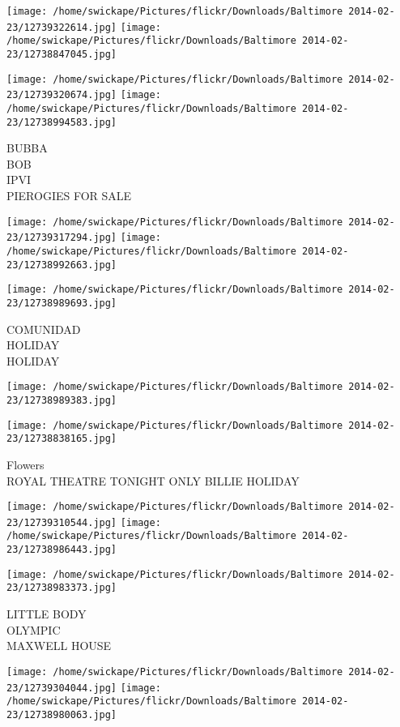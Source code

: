 \documentclass[10pt,letterpaper]{article}
\begin{document}
\texttt{[image: /home/swickape/Pictures/flickr/Downloads/Baltimore 2014-02-23/12739322614.jpg]}
\texttt{[image: /home/swickape/Pictures/flickr/Downloads/Baltimore 2014-02-23/12738847045.jpg]}

\texttt{[image: /home/swickape/Pictures/flickr/Downloads/Baltimore 2014-02-23/12739320674.jpg]}
\texttt{[image: /home/swickape/Pictures/flickr/Downloads/Baltimore 2014-02-23/12738994583.jpg]}

BUBBA\\
BOB\\
IPVI\\
PIEROGIES FOR SALE
\pagebreak

\texttt{[image: /home/swickape/Pictures/flickr/Downloads/Baltimore 2014-02-23/12739317294.jpg]}
\texttt{[image: /home/swickape/Pictures/flickr/Downloads/Baltimore 2014-02-23/12738992663.jpg]}

\texttt{[image: /home/swickape/Pictures/flickr/Downloads/Baltimore 2014-02-23/12738989693.jpg]}

COMUNIDAD\\
HOLIDAY\\
HOLIDAY
\pagebreak

\texttt{[image: /home/swickape/Pictures/flickr/Downloads/Baltimore 2014-02-23/12738989383.jpg]}

\vspace{0.25in}
\texttt{[image: /home/swickape/Pictures/flickr/Downloads/Baltimore 2014-02-23/12738838165.jpg]}

Flowers\\
ROYAL THEATRE TONIGHT ONLY BILLIE HOLIDAY
\pagebreak

\texttt{[image: /home/swickape/Pictures/flickr/Downloads/Baltimore 2014-02-23/12739310544.jpg]}
\texttt{[image: /home/swickape/Pictures/flickr/Downloads/Baltimore 2014-02-23/12738986443.jpg]}

\vspace{0.25in}
\texttt{[image: /home/swickape/Pictures/flickr/Downloads/Baltimore 2014-02-23/12738983373.jpg]}

LITTLE BODY\\
OLYMPIC\\
MAXWELL HOUSE
\pagebreak

\texttt{[image: /home/swickape/Pictures/flickr/Downloads/Baltimore 2014-02-23/12739304044.jpg]}
\texttt{[image: /home/swickape/Pictures/flickr/Downloads/Baltimore 2014-02-23/12738980063.jpg]}
\end{document}
